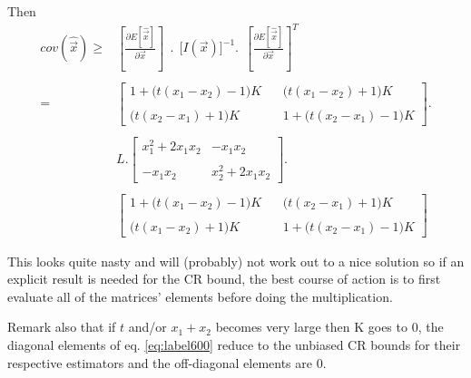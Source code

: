 \documentclass[report,12pt]{report}
\begin{document}
Then
\begin{align}
	cov(\hat{\vec x}) \geq& \left[ \frac{\partial E[\hat{\vec x}]}{\partial \vec x} \right]\ \ .\ \ \Bigg[I(\vec x)\Bigg]^{-1} .\ \ \left[ \frac{\partial E[\hat{\vec x}]}{\partial \vec x} \right]^T
	\nonumber\\ 	\nonumber\\
	=\ &
	\left[ \begin{array}{cc}
	1 + \big(t(x_1-x_2)-1\big)K\ \ \ \
	&
	\big(t(x_1-x_2)+1\big)K
	\\
	\\
	\big(t(x_2-x_1)+1\big)K\ \ \ \
	&
	1 + \big(t(x_2-x_1)-1\big)K
	\end{array} \right] .
	\nonumber\\ 	\nonumber\\
	&L . 
	\left[ \begin{array}{cc} 
	x_1^2 + 2 x_1 x_2
	&
	-x_1 x_2
	\\
	\\
	-x_1 x_2
	&
	x_2^2 + 2 x_1 x_2
	\end{array} \right] .
	\nonumber\\ 	\nonumber\\
	&\left[ \begin{array}{cc}
	1 + \big(t(x_1-x_2)-1\big)K\ \ \ \
	&
	\big(t(x_2-x_1)+1\big)K
	\\
	\\
	\big(t(x_1-x_2)+1\big)K\ \ \ \
	&
	1 + \big(t(x_2-x_1)-1\big)K
	\end{array} \right]
	\label{eq:label600}
\end{align}

This looks quite nasty and will (probably) not work out to a nice solution so if an explicit result is needed for the CR bound, the best course of action is to first evaluate all of the matrices' elements before doing the multiplication. 

Remark also that if $t$ and/or $x_1 + x_2$ becomes very large then K goes to 0, the diagonal elements of eq. \ref{eq:label600} reduce to the unbiased CR bounds for their respective estimators and the off-diagonal elements are 0.




\end{document}
